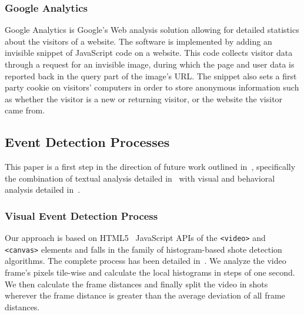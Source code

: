 \documentclass[runningheads,a4paper]{llncs}
\begin{document}
\subsubsection{Google Analytics}
Google Analytics is Google's Web analysis solution allowing for detailed statistics about the visitors of a website. The software is implemented by adding an invisible snippet of JavaScript code on a website. This code collects visitor data through a request for an invisible image, during which the page and user data is reported back in the query part of the image's URL. The snippet also sets a first party cookie on visitors' computers in order to store anonymous information such as whether the visitor is a new or returning visitor, or the website the visitor came from.

\subsection{Event Detection Processes}
This paper is a first step in the direction of future work outlined in~\cite{artemis}, specifically the combination of textual analysis detailed in~\cite{semwebvid} with visual and behavioral analysis detailed in~\cite{artemis}. 

\subsubsection{Visual Event Detection Process}
Our approach is based on HTML5~\cite{w3c_html5} JavaScript APIs of the \texttt{<video>} and \texttt{<canvas>} elements and falls in the family of histogram-based shote detection algorithms. The complete process has been detailed in~\cite{artemis}. We analyze the video frame's pixels tile-wise and calculate the local histograms in steps of one second. We then calculate the frame distances and finally split the video in shots wherever the frame distance is greater than the average deviation of all frame distances.
\end{document}
